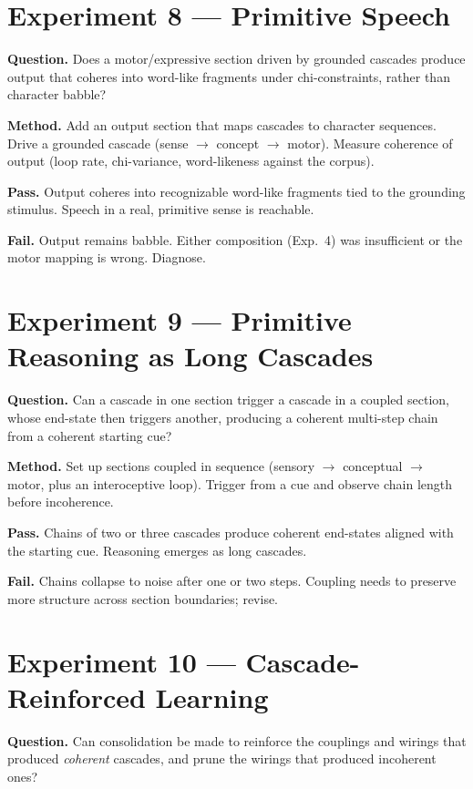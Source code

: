\documentclass[11pt]{article}
\begin{document}
\section{Experiment 8 --- Primitive Speech}

\textbf{Question.} Does a motor/expressive section driven by grounded
cascades produce output that coheres into word-like fragments
under chi-constraints, rather than character babble?

\textbf{Method.} Add an output section that maps cascades to character
sequences. Drive a grounded cascade (sense $\to$ concept $\to$ motor).
Measure coherence of output (loop rate, chi-variance, word-likeness
against the corpus).

\textbf{Pass.} Output coheres into recognizable word-like
fragments tied to the grounding stimulus. Speech in a real, primitive
sense is reachable.

\textbf{Fail.} Output remains babble. Either composition (Exp.\ 4) was
insufficient or the motor mapping is wrong. Diagnose.

\section{Experiment 9 --- Primitive Reasoning as Long Cascades}

\textbf{Question.} Can a cascade in one section trigger a cascade in
a coupled section, whose end-state then triggers another, producing
a coherent multi-step chain from a coherent starting cue?

\textbf{Method.} Set up sections coupled in sequence (sensory $\to$
conceptual $\to$ motor, plus an interoceptive loop). Trigger from a
cue and observe chain length before incoherence.

\textbf{Pass.} Chains of two or three cascades produce coherent
end-states aligned with the starting cue. Reasoning emerges as long
cascades.

\textbf{Fail.} Chains collapse to noise after one or two steps.
Coupling needs to preserve more structure across section boundaries;
revise.

\section{Experiment 10 --- Cascade-Reinforced Learning}

\textbf{Question.} Can consolidation be made to reinforce the
couplings and wirings that produced \emph{coherent} cascades, and
prune the wirings that produced incoherent ones?
\end{document}
